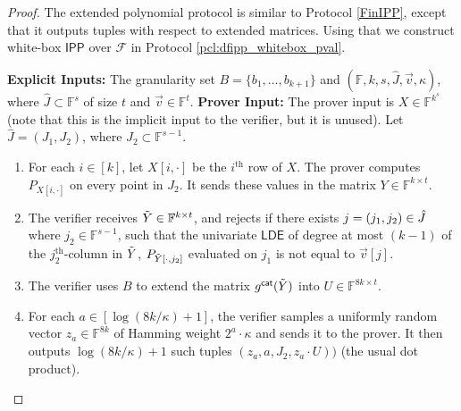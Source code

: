 \documentclass[10pt,a4paper]{article}
\makeatletter
\newcommand{\IPP}{\mathsf{IPP}}
\newcommand{\LDE}{\mathsf{LDE}}
\newcommand{\F}{\mathbb{F}}
\newcommand{\sF}{\mathcal{F}}
\newenvironment{protocol}[1][htb]{
    \renewcommand{\ALG@name}{Protocol}
    \begin{algorithm}[#1]
    }{\end{algorithm}
}
\makeatother
\begin{document}
\begin{proof}
The extended polynomial protocol is similar to Protocol \ref{FinIPP}, except that it outputs tuples with respect to extended matrices. Using that we construct white-box $\IPP$ over $\sF$ in Protocol \ref{pcl:dfipp_whitebox_pval}. 
\begin{protocol}
\caption{Extended Polynomial Folding Protocol}
\label{pcl:epf_protocol}
\begin{algorithmic}{}
 \vspace{0.1in}
\STATE \textbf{Explicit Inputs:} The granularity set $B = \{b_1, \dots, b_{k+1}\}$ and $(\F, k, s, \hat{J}, \Vec{v},\kappa)$, where $\hat{J} \subset \F^s$ of size $t$ and $\vec{v} \in \F^t$.
\vspace{0.1in}
\STATE \textbf{Prover Input:} The prover input is $X \in \F^{k^{s}}$ (note that this is the implicit input to the verifier, but it is unused).
\vspace{0.1in}
\STATE Let $\hat{J} = (J_1, J_2)$, where $J_2 \subset \F^{s-1}$.
\begin{enumerate}
    \item For each $i \in [k]$, let $X[i,\cdot]$ be the $i^{\text{th}}$ row of $X$. The prover computes $P_{X[i,\cdot]}$ on every point in $J_2$. It sends these values in the matrix $Y \in \F^{k \times t}$.         
    \item The verifier receives $\Tilde{Y} \in \F^{k \times t}$, and rejects if there exists $j = (j_1,j_2) \in \Hat{J}$ where $j_2 \in \F^{s-1}$, such that the univariate $\LDE$ of degree at most $(k-1)$ of the $j_2^{\text{th}}$-column in $\Tilde{Y}$, $P_{\Tilde{Y}[\cdot, j_2]}$ evaluated on $j_1$ is not equal to $\Vec{v}[j]$.
            
    \item The verifier uses $B$ to extend the matrix $g^{\mathsf{cat}}(\Tilde{Y})$ into $U \in \F^{8k \times t}$.
            
    \item For each $a \in [\log (8k/\kappa)+1]$, the verifier samples a uniformly random vector $z_a \in \F^{8k}$ of Hamming weight $2^a\cdot\kappa$ and sends it to the prover. It then outputs $\log (8k/\kappa)+1$ such tuples $(z_a, a, J_2, z_a \cdot U))$ (the usual dot product).
    \end{enumerate}
\end{algorithmic}
\end{protocol}


\end{proof}
\end{document}
